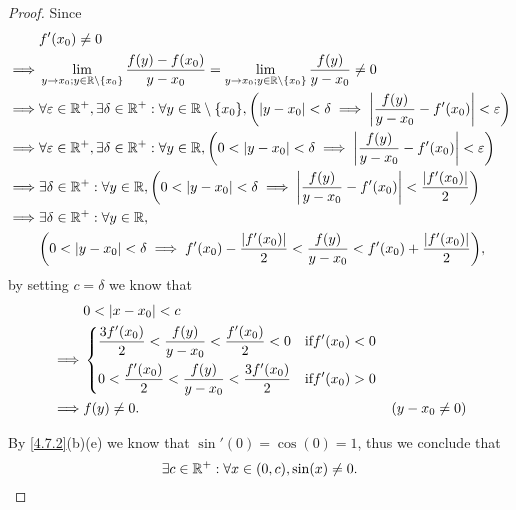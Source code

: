 \begin{proof}
  Since
  \begin{align*}
             & f'(x_0) \neq 0                                                                                                                                                                                \\
    \implies & \lim_{y \to x_0 ; y \in \R \setminus \set{x_0}} \dfrac{f(y) - f(x_0)}{y - x_0} = \lim_{y \to x_0 ; y \in \R \setminus \set{x_0}} \dfrac{f(y)}{y - x_0} \neq 0                                 \\
    \implies & \forall \varepsilon \in \R^+, \exists \delta \in \R^+ : \forall y \in \R \setminus \set{x_0}, \bigg(\abs{y - x_0} < \delta \implies \abs{\dfrac{f(y)}{y - x_0} - f'(x_0)} < \varepsilon\bigg) \\
    \implies & \forall \varepsilon \in \R^+, \exists \delta \in \R^+ : \forall y \in \R, \bigg(0 < \abs{y - x_0} < \delta \implies \abs{\dfrac{f(y)}{y - x_0} - f'(x_0)} < \varepsilon\bigg)                 \\
    \implies & \exists \delta \in \R^+ : \forall y \in \R, \bigg(0 < \abs{y - x_0} < \delta \implies \abs{\dfrac{f(y)}{y - x_0} - f'(x_0)} < \dfrac{\abs{f'(x_0)}}{2}\bigg)                                  \\
    \implies & \exists \delta \in \R^+ : \forall y \in \R,                                                                                                                                                   \\
             & \bigg(0 < \abs{y - x_0} < \delta \implies f'(x_0) - \dfrac{\abs{f'(x_0)}}{2} < \dfrac{f(y)}{y - x_0} < f'(x_0) + \dfrac{\abs{f'(x_0)}}{2}\bigg),
  \end{align*}
  by setting \(c = \delta\) we know that
  \begin{align*}
             & 0 < \left\lvert x - x_0\right\rvert < c                                                                                               \\
    \implies & \begin{dcases}
                 \dfrac{3 f'(x_0)}{2} < \dfrac{f(y)}{y - x_0} < \dfrac{f'(x_0)}{2} < 0 & \text{if} f'(x_0) < 0 \\
                 0 < \dfrac{f'(x_0)}{2} < \dfrac{f(y)}{y - x_0} < \dfrac{3 f'(x_0)}{2} & \text{if} f'(x_0) > 0
               \end{dcases}                       \\
    \implies & f(y) \neq 0.                                                                                     & (y - x_0 \neq 0)
  \end{align*}

  By \cref{4.7.2}(b)(e) we know that \(\sin'(0) = \cos(0) = 1\), thus we conclude that
  \[
    \exists c \in \mathbb{R}^+ : \forall x \in (0, c), \sin(x) \neq 0.
  \]
\end{proof}

